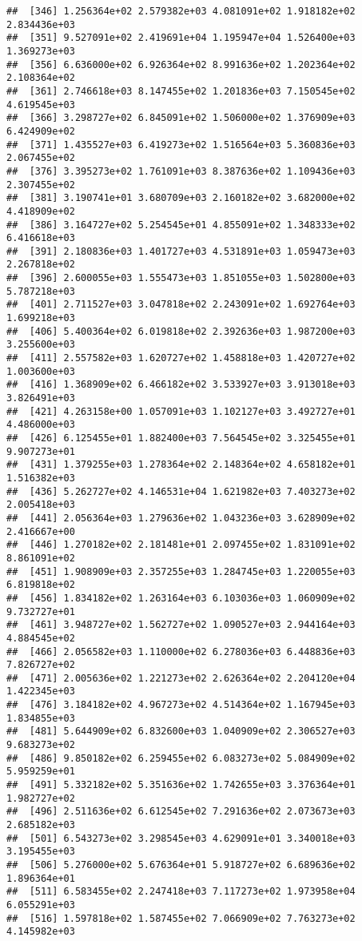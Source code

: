 \documentclass[]{article}
\begin{document}
\begin{verbatim}
##  [346] 1.256364e+02 2.579382e+03 4.081091e+02 1.918182e+02 2.834436e+03
##  [351] 9.527091e+02 2.419691e+04 1.195947e+04 1.526400e+03 1.369273e+03
##  [356] 6.636000e+02 6.926364e+02 8.991636e+02 1.202364e+02 2.108364e+02
##  [361] 2.746618e+03 8.147455e+02 1.201836e+03 7.150545e+02 4.619545e+03
##  [366] 3.298727e+02 6.845091e+02 1.506000e+02 1.376909e+03 6.424909e+02
##  [371] 1.435527e+03 6.419273e+02 1.516564e+03 5.360836e+03 2.067455e+02
##  [376] 3.395273e+02 1.761091e+03 8.387636e+02 1.109436e+03 2.307455e+02
##  [381] 3.190741e+01 3.680709e+03 2.160182e+02 3.682000e+02 4.418909e+02
##  [386] 3.164727e+02 5.254545e+01 4.855091e+02 1.348333e+02 6.416618e+03
##  [391] 2.180836e+03 1.401727e+03 4.531891e+03 1.059473e+03 2.267818e+02
##  [396] 2.600055e+03 1.555473e+03 1.851055e+03 1.502800e+03 5.787218e+03
##  [401] 2.711527e+03 3.047818e+02 2.243091e+02 1.692764e+03 1.699218e+03
##  [406] 5.400364e+02 6.019818e+02 2.392636e+03 1.987200e+03 3.255600e+03
##  [411] 2.557582e+03 1.620727e+02 1.458818e+03 1.420727e+02 1.003600e+03
##  [416] 1.368909e+02 6.466182e+02 3.533927e+03 3.913018e+03 3.826491e+03
##  [421] 4.263158e+00 1.057091e+03 1.102127e+03 3.492727e+01 4.486000e+03
##  [426] 6.125455e+01 1.882400e+03 7.564545e+02 3.325455e+01 9.907273e+01
##  [431] 1.379255e+03 1.278364e+02 2.148364e+02 4.658182e+01 1.516382e+03
##  [436] 5.262727e+02 4.146531e+04 1.621982e+03 7.403273e+02 2.005418e+03
##  [441] 2.056364e+03 1.279636e+02 1.043236e+03 3.628909e+02 2.416667e+00
##  [446] 1.270182e+02 2.181481e+01 2.097455e+02 1.831091e+02 8.861091e+02
##  [451] 1.908909e+03 2.357255e+03 1.284745e+03 1.220055e+03 6.819818e+02
##  [456] 1.834182e+02 1.263164e+03 6.103036e+03 1.060909e+02 9.732727e+01
##  [461] 3.948727e+02 1.562727e+02 1.090527e+03 2.944164e+03 4.884545e+02
##  [466] 2.056582e+03 1.110000e+02 6.278036e+03 6.448836e+03 7.826727e+02
##  [471] 2.005636e+02 1.221273e+02 2.626364e+02 2.204120e+04 1.422345e+03
##  [476] 3.184182e+02 4.967273e+02 4.514364e+02 1.167945e+03 1.834855e+03
##  [481] 5.644909e+02 6.832600e+03 1.040909e+02 2.306527e+03 9.683273e+02
##  [486] 9.850182e+02 6.259455e+02 6.083273e+02 5.084909e+02 5.959259e+01
##  [491] 5.332182e+02 5.351636e+02 1.742655e+03 3.376364e+01 1.982727e+02
##  [496] 2.511636e+02 6.612545e+02 7.291636e+02 2.073673e+03 2.685182e+03
##  [501] 6.543273e+02 3.298545e+03 4.629091e+01 3.340018e+03 3.195455e+03
##  [506] 5.276000e+02 5.676364e+01 5.918727e+02 6.689636e+02 1.896364e+01
##  [511] 6.583455e+02 2.247418e+03 7.117273e+02 1.973958e+04 6.055291e+03
##  [516] 1.597818e+02 1.587455e+02 7.066909e+02 7.763273e+02 4.145982e+03

\end{verbatim}
\end{document}
